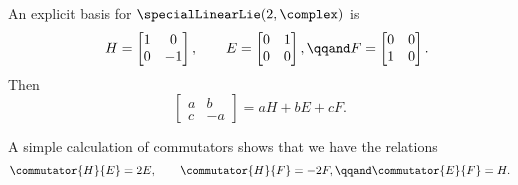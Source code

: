 \documentclass[fleqn]{NotesClass}
\begin{document}
    An explicit basis for \(\specialLinearLie(2, \complex)\) is
    \begin{equation}
        \quad H = 
        \begin{bmatrix}
            1 & 0\\
            0 & -1
        \end{bmatrix}
        , \qquad
        E = 
        \begin{bmatrix}
            0 & 1\\
            0 & 0
        \end{bmatrix}
        , \qqand F = 
        \begin{bmatrix}
            0 & 0\\
            1 & 0
        \end{bmatrix}
        .
    \end{equation}
    Then
    \begin{equation}
        \begin{bmatrix}
            a & b\\
            c & -a
        \end{bmatrix}
        = aH + bE + cF.
    \end{equation}
    
    A simple calculation of commutators shows that we have the relations
    \begin{equation}
        \commutator{H}{E} = 2E, \qquad \commutator{H}{F} = -2F, \qqand \commutator{E}{F} = H.
    \end{equation}
    
\end{document}
